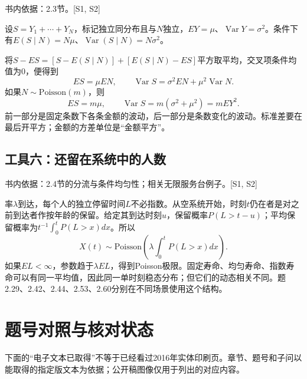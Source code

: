 \documentclass[
  11pt,
  a4paper,
  UTF8,fontset=fandol]{ctexart}
\let\OldSection\section
\renewcommand{\section}{\Needspace{7\baselineskip}\OldSection}
\let\OldSubsection\subsection
\renewcommand{\subsection}{\Needspace{5\baselineskip}\OldSubsection}
\begin{document}
书内依据：2.3节。{[}S1, S2{]}

设\(S=Y_1+\cdots+Y_N\)，标记独立同分布且与\(N\)独立，\(EY=\mu\)、\(\operatorname{Var}Y=\sigma^2\)。条件下有\(E(S\mid N)=N\mu\)、\(\operatorname{Var}(S\mid N)=N\sigma^2\)。

将\(S-ES=[S-E(S\mid N)]+[E(S\mid N)-ES]\)平方取平均，交叉项条件均值为0，便得到
\[ES=\mu EN,\qquad\operatorname{Var}S=\sigma^2EN+\mu^2\operatorname{Var}N.\]
如果\(N\sim\mathrm{Poisson}(m)\)，则
\[\boxed{ES=m\mu,\qquad\operatorname{Var}S=m(\sigma^2+\mu^2)=mEY^2.}\]
前一部分是固定条数下各条金额的波动，后一部分是条数变化的波动。标准差要在最后开平方；金额的方差单位是``金额平方''。

\subsection{工具六：还留在系统中的人数}\label{ux5de5ux5177ux516dux8fd8ux7559ux5728ux7cfbux7edfux4e2dux7684ux4ebaux6570}

书内依据：2.4节的分流与条件均匀性；相关无限服务台例子。{[}S1, S2{]}

率\(\lambda\)到达，每个人的独立停留时间\(L\)不必指数。从空系统开始，时刻\(t\)仍在者是对之前到达者作按年龄的保留。给定其到达时刻\(u\)，保留概率\(P(L>t-u)\)；平均保留概率为\(t^{-1}\int_0^tP(L>x)dx\)。所以
\[X(t)\sim\mathrm{Poisson}\left(\lambda\int_0^tP(L>x)dx\right).\]
如果\(EL<\infty\)，参数趋于\(\lambda EL\)，得到Poisson极限。固定寿命、均匀寿命、指数寿命可以有同一平均值，因此同一单时刻稳态分布；但它们的动态相关不同。题2.29、2.42、2.44、2.53、2.60分别在不同场景使用这个结构。

\section{题号对照与核对状态}\label{ux9898ux53f7ux5bf9ux7167ux4e0eux6838ux5bf9ux72b6ux6001}

下面的``电子文本已取得''不等于已经看过2016年实体印刷页。章节、题号和子问以能取得的指定版文本为依据；公开稿图像仅用于列出的对应内容。
\end{document}
